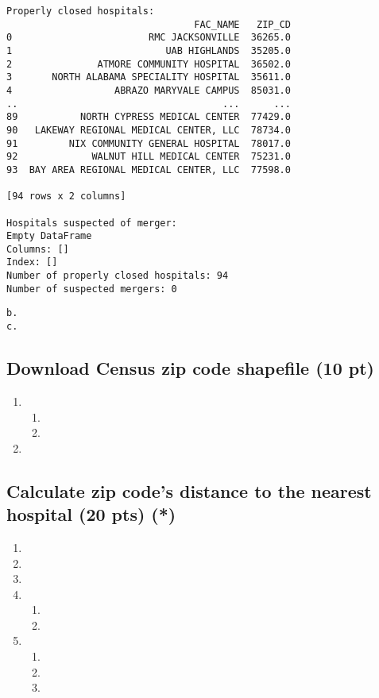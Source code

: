 \documentclass[
  letterpaper,
  DIV=11,
  numbers=noendperiod]{scrartcl}
\providecommand{\tightlist}{%
  \setlength{\itemsep}{0pt}\setlength{\parskip}{0pt}}\usepackage{longtable,booktabs,array}
\begin{document}
\begin{verbatim}
Properly closed hospitals:
                                 FAC_NAME   ZIP_CD
0                        RMC JACKSONVILLE  36265.0
1                           UAB HIGHLANDS  35205.0
2               ATMORE COMMUNITY HOSPITAL  36502.0
3       NORTH ALABAMA SPECIALITY HOSPITAL  35611.0
4                  ABRAZO MARYVALE CAMPUS  85031.0
..                                    ...      ...
89           NORTH CYPRESS MEDICAL CENTER  77429.0
90   LAKEWAY REGIONAL MEDICAL CENTER, LLC  78734.0
91         NIX COMMUNITY GENERAL HOSPITAL  78017.0
92             WALNUT HILL MEDICAL CENTER  75231.0
93  BAY AREA REGIONAL MEDICAL CENTER, LLC  77598.0

[94 rows x 2 columns]

Hospitals suspected of merger:
Empty DataFrame
Columns: []
Index: []
Number of properly closed hospitals: 94
Number of suspected mergers: 0
\end{verbatim}

\begin{verbatim}
b.
c.
\end{verbatim}

\subsection{Download Census zip code shapefile (10
pt)}\label{download-census-zip-code-shapefile-10-pt}

\begin{enumerate}
\def\labelenumi{\arabic{enumi}.}
\tightlist
\item
  \begin{enumerate}
  \def\labelenumii{\alph{enumii}.}
  \tightlist
  \item
  \item
  \end{enumerate}
\item
\end{enumerate}

\subsection{Calculate zip code's distance to the nearest hospital (20
pts)
(*)}\label{calculate-zip-codes-distance-to-the-nearest-hospital-20-pts}

\begin{enumerate}
\def\labelenumi{\arabic{enumi}.}
\tightlist
\item
\item
\item
\item
  \begin{enumerate}
  \def\labelenumii{\alph{enumii}.}
  \tightlist
  \item
  \item
  \end{enumerate}
\item
  \begin{enumerate}
  \def\labelenumii{\alph{enumii}.}
  \tightlist
  \item
  \item
  \item
  \end{enumerate}
\end{enumerate}
\end{document}
